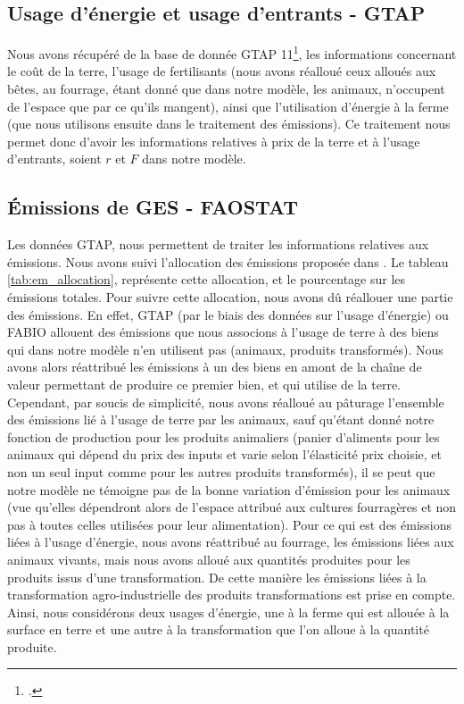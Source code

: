 \subsection{Usage d'énergie et usage d'entrants - GTAP}

Nous avons récupéré de la base de donnée GTAP 11\footcite{Aguiar2022}, les informations concernant le coût de la terre, l'usage de fertilisants (nous avons réalloué ceux alloués aux bêtes, au fourrage, étant donné que dans notre modèle, les animaux, n'occupent de l'espace que par ce qu'ils mangent), ainsi que l'utilisation d'énergie à la ferme (que nous utilisons ensuite dans le traitement des émissions). Ce traitement nous permet donc d'avoir les informations relatives à prix de la terre et à l'usage d'entrants, soient $r$ et $F$ dans notre modèle.


\subsection{Émissions de GES - FAOSTAT}

Les données GTAP, nous permettent de traiter les informations relatives aux émissions. Nous avons suivi l'allocation des émissions proposée dans \cite{Valin2023}. Le tableau \ref{tab:em_allocation}, représente cette allocation, et le pourcentage sur les émissions totales. Pour suivre cette allocation, nous avons dû réallouer une partie des émissions. En effet, GTAP (par le biais des données sur l'usage d'énergie) ou FABIO allouent des émissions que nous associons à l'usage de terre à des biens qui dans notre modèle n'en utilisent pas (animaux, produits transformés). Nous avons alors réattribué les émissions à un des biens en amont de la chaîne de valeur permettant de produire ce premier bien, et qui utilise de la terre. Cependant, par soucis de simplicité, nous avons réalloué au pâturage l'ensemble des émissions lié à l'usage de terre par les animaux, sauf qu'étant donné notre fonction de production pour les produits animaliers (panier d'aliments pour les animaux qui dépend du prix des inputs et varie selon l'élasticité prix choisie, et non un seul input comme pour les autres produits transformés), il se peut que notre modèle ne témoigne pas de la bonne variation d'émission pour les animaux (vue qu'elles dépendront alors de l'espace attribué aux cultures fourragères et non pas à toutes celles utilisées pour leur alimentation). Pour ce qui est des émissions liées à l'usage d'énergie, nous avons réattribué au fourrage, les émissions liées aux animaux vivants, mais nous avons alloué aux quantités produites pour les produits issus d'une transformation. De cette manière les émissions liées à la transformation agro-industrielle des produits transformations est prise en compte. Ainsi, nous considérons deux usages d'énergie, une à la ferme qui est allouée à la surface en terre et une autre à la transformation que l'on alloue à la quantité produite.

